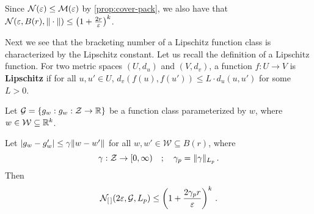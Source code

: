 \documentclass[twoside]{article}
\newcommand{\set}[1]{\left\{#1\right\}}
\begin{document}
Since $\mathcal{N}(\varepsilon) \le \mathcal{M}(\varepsilon)$ by \cref{prop:cover-pack}, we also have that $\mathcal{N}(\varepsilon, B(r), \|\cdot\|) \le \left(1+\frac{2r}{\varepsilon}\right)^k $.

Next we see that the bracketing number of a Lipschitz function class is characterized by the Lipschitz constant. Let us recall the definition of a Lipschitz function. For two metric spaces $(U, d_u)$ and $(V, d_v)$, a function $f: U \to V$ is \textbf{Lipschitz} if for all $u, u' \in U$, $d_v(f(u), f(u')) \le L \cdot d_u(u, u')$ for some $L > 0$.

Let $\cG = \set{g_w: g_w: \cZ \to \R}$ be a function class parameterized by $w$, where $w \in \mathcal{W} \subseteq \mathbb{R}^k$.
\begin{proposition}
    Let $|g_w - g_w'| \le \gamma \|w - w'\|$ for all $w, w' \in \mathcal{W} \subseteq B(r)$, where 
    \[
    \gamma : \mathcal{Z} \to [0, \infty) \quad ; \quad \gamma_p = \|\gamma\|_{L_p} \,.
    \]
    Then
    \[
        \mathcal{N}_{[\,]}(2\varepsilon, \mathcal{G}, L_p) \le \left(1 + \frac{2\gamma_p r}{\varepsilon} \right)^k \,.
    \]
\end{proposition}
 
\end{document}
